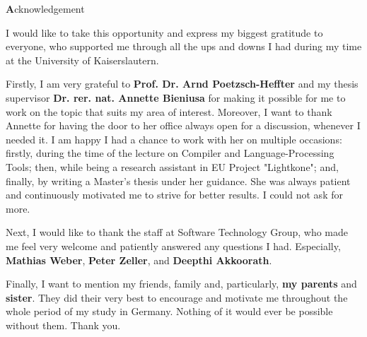 
\begin{center}
{\Large \textbf Acknowledgement}
\end{center}
\vspace{1cm}

I would like to take this opportunity and express my biggest gratitude to everyone, who supported me through all the ups and downs I had during my time at the University of Kaiserslautern. 

Firstly, I am very grateful to \textbf{Prof. Dr. Arnd Poetzsch-Heffter} and my thesis supervisor \textbf{Dr. rer. nat. Annette Bieniusa} for making it possible for me to work on the topic that suits my area of interest. Moreover, I want to thank Annette for having the door to her office always open for a discussion, whenever I needed it. I am happy I had a chance to work with her on multiple occasions: firstly, during the time of the lecture on Compiler and Language-Processing Tools; then, while being a research assistant in EU Project "Lightkone"; and, finally, by writing a Master's thesis under her guidance. She was always patient and continuously motivated me to strive for better results. I could not ask for more.

Next, I would like to thank the staff at Software Technology Group, who made me feel very welcome and patiently answered any questions I had. Especially, \textbf{Mathias Weber}, \textbf{Peter Zeller}, and \textbf{Deepthi Akkoorath}.

Finally, I want to mention my friends, family and, particularly, \textbf{my parents} and \textbf{sister}. They did their very best to encourage and motivate me throughout the whole period of my study in Germany. Nothing of it would ever be possible without them. Thank you.
